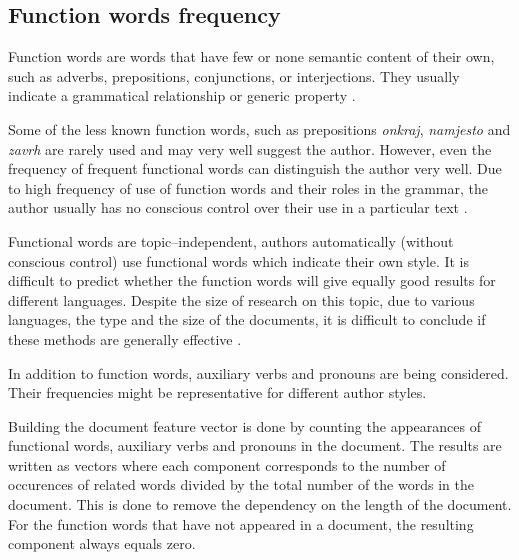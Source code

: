 \documentclass[11pt,english]{article}
\begin{document}
\begin{multicols}{2}


\subsection{Function words frequency}
\label{sec:funkcijske-rijeci}
Function words are words that have few or none semantic content of their
own, such as adverbs, prepositions, conjunctions, or interjections. They usually
indicate a grammatical relationship or generic property
\citep{zhao2005effective}.

Some of the less known function words, such as prepositions \emph{onkraj},
\emph{namjesto} and \emph{zavrh} are rarely used and may very well suggest the
author. However, even the frequency of frequent functional words can distinguish the author very well. Due to high frequency of use of
function words and their roles in the grammar, the author usually has no
conscious control over their use in a particular text
\citep{argamon2005measuring}.

Functional words are topic--independent, authors automatically (without conscious
control) use functional words which indicate their own style.
It is difficult to predict whether the function words will give equally good
results for different languages. Despite the size of research on this
topic, due to various languages, the type and the size of the documents, it is difficult to
conclude if these methods are generally effective \citep{zhao2005effective}.

In addition to function words, auxiliary verbs and pronouns are being
considered. Their frequencies might be representative for different
author styles.

Building the document feature vector is done by counting the appearances
of functional words, auxiliary verbs and pronouns in the document. The results
are written as vectors where each component corresponds to the number of occurences of
related words divided by the total number of the words in the document. This is done to remove
the dependency on the length of the document. For the function words that have not
appeared in a document, the resulting component always equals zero.


\end{multicols}
\end{document}
